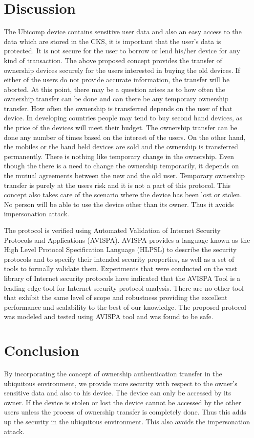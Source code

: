 \documentclass[letterpaper]{article}
\begin{document}
\section{Discussion}
The Ubicomp device contains sensitive user data and also an easy access to the data which are stored in the CKS, it is important that the user's data is protected. It is not secure for the user to borrow or lend his/her device for any kind of transaction. The above proposed concept provides the transfer of ownership devices securely for the users interested in buying the old devices. If either of the users do not provide accurate information, the transfer will be aborted. At this point, there may be a question arises as to how often the ownership transfer can be done and can there be any temporary ownership transfer. How often the ownership is transferred depends on the user of that device. In developing countries people may tend to buy second hand devices, as the price of the devices will meet their budget. The ownership transfer can be done any number of times based on the interest of the users. On the other hand, the mobiles or the hand held devices are sold and the ownership is transferred permanently. There is nothing like temporary change in the ownership. Even though the there is a need to change the ownership temporarily, it depends on the mutual agreements between the new and the old user. Temporary ownership transfer is purely at the users risk and it is not a part of this protocol. This concept also takes care of the scenario where the device has been lost or stolen. No person will be able to use the device other than its owner. Thus it avoids impersonation attack.
\par
The protocol is verified using Automated Validation of Internet Security Protocols and Applications (AVISPA). AVISPA provides a language known as the High Level Protocol Specification Language (HLPSL) to describe the security protocols and to specify their intended security properties, as well as a set of tools to formally validate them. Experiments that were conducted on the vast library of Internet security
protocols have indicated that the AVISPA Tool is a leading edge tool for Internet security protocol analysis. There are no other tool that exhibit the same level of scope and robustness providing the excellent performance and scalability to the best of our knowledge. The proposed protocol was modeled and tested using AVISPA tool and was found to be safe.


\section{Conclusion}
By incorporating the concept of ownership authentication transfer in the ubiquitous environment, we provide more security with respect to the owner's sensitive data and also to his device. The device can only be accessed by its owner. If the device is stolen or lost the device cannot be accessed by the other users unless the process of ownership transfer is completely done. Thus this adds up the security in the ubiquitous environment. This also avoids the impersonation attack. 

\vspace{1cm}


\end{document}
